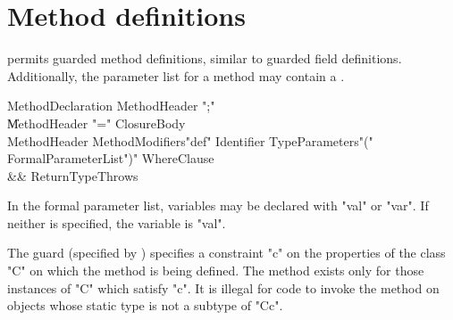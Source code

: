 
\section{Method definitions}

\Xten{} permits guarded method definitions, similar to guarded
field definitions. Additionally, the parameter list for a method may
contain a .

\begin{grammar}
MethodDeclaration \: MethodHeader \xcd";" \\
                  \| MethodHeader \xcd"=" ClosureBody \\
MethodHeader \:  
  MethodModifiers\opt \xcd"def" Identifier TypeParameters\opt \xcd"("
  FormalParameterList\opt \xcd")" WhereClause\opt \\
  && ReturnType\opt Throws\opt \\
\end{grammar}

In the formal parameter list, variables may be declared with
\xcd"val" or \xcd"var".  If neither is specified, the variable
is \xcd"val".

The guard (specified by )
specifies a constraint \xcd"c" on the
properties of the class \xcd"C" on which the method is being defined. The
method exists only for those instances of \xcd"C" which satisfy \xcd"c".  It is
illegal for code to invoke the method on objects whose static type is
not a subtype of \xcd"C{c}".

